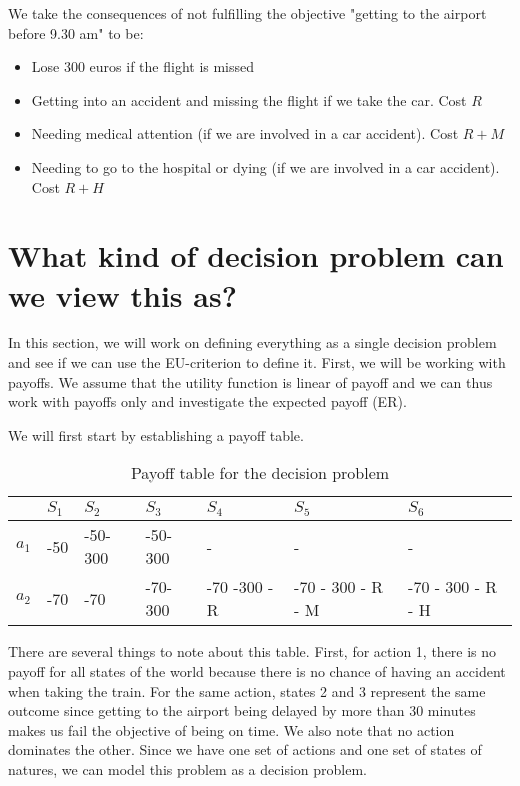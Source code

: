 \documentclass[letterpaper,12pt]{article}
\begin{document}
We take the consequences of not fulfilling the objective "getting to the airport before 9.30 am" to be:

\begin{itemize}
	\item Lose 300 euros if the flight is missed
	\item Getting into an accident and missing the flight if we take the car. Cost $R$
	\item Needing medical attention (if we are involved in a car accident). Cost $R + M$
	\item Needing to go to the hospital or dying (if we are involved in a car accident). Cost $R + H$
\end{itemize}

\section{What kind of decision problem can we view this as?}

In this section, we will work on defining everything as a single decision problem and see if we can use the EU-criterion to define it. First, we will be working with payoffs. We assume that the utility function is linear of payoff and we can thus work with payoffs only and investigate the expected payoff (ER).

We will first start by establishing a payoff table.

\begin{table}[h!]
\begin{center}
\begin{tabular}{|l|l|l|l|l|l|l|}
\hline
   & $S_1$ & $S_2$      & $S_3$     & $S_4$           & $S_5$              & $S_6$              \\ \hline
$a_1$ & -50  & -50-300 & -50-300 &      -        &        -         &                - \\ \hline
$a_2$ & -70  & -70     & -70-300 & -70 -300 - R & -70 - 300 - R - M & -70 - 300 - R - H \\ \hline
\end{tabular}
\caption{Payoff table for the decision problem}
\end{center}
\end{table}

There are several things to note about this table. First, for action 1, there is no payoff for all states of the world because there is no chance of having an accident when taking the train. For the same action, states 2 and 3 represent the same outcome since getting to the airport being delayed by more than 30 minutes makes us fail the objective of being on time. We also note that no action dominates the other. Since we have one set of actions and one set of states of natures, we can model this problem as a decision problem.
\end{document}
